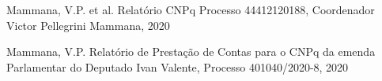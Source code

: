 \documentclass[
12pt,		%
openright,	%
twoside,  %
a4paper,			%
chapter=TITLE,		%
english,			%
french,				%
spanish,			%
brazil				%
]{USPSC-classe/USPSC}
\begin{document}
\begin{flushleft}
\begin{flushleft}
\begin{flushleft}
\begin{flushleft}
\begin{flushleft}
\begin{flushleft}
\begin{flushleft}
\begin{flushleft}
\begin{flushleft}
[CNPq, 2020a] Mammana, V.P. et al. Relat\'orio CNPq Processo 44412120188, Coordenador Victor Pellegrini Mammana, 2020
\end{flushleft}


\end{flushleft}


\end{flushleft}


\end{flushleft}


\end{flushleft}


\end{flushleft}


\end{flushleft}


\end{flushleft}


\end{flushleft}


\begin{flushleft}
\begin{flushleft}
\begin{flushleft}
\begin{flushleft}
\begin{flushleft}
\begin{flushleft}
\begin{flushleft}
\begin{flushleft}
\begin{flushleft}
[CNPq, 2020b] Mammana, V.P. Relat\'orio de Presta\c{c}\~ao de Contas para o CNPq da emenda Parlamentar do Deputado Ivan Valente, Processo 401040/2020-8, 2020
\end{flushleft}


\end{flushleft}


\end{flushleft}


\end{flushleft}


\end{flushleft}


\end{flushleft}


\end{flushleft}


\end{flushleft}


\end{flushleft}
\end{document}
